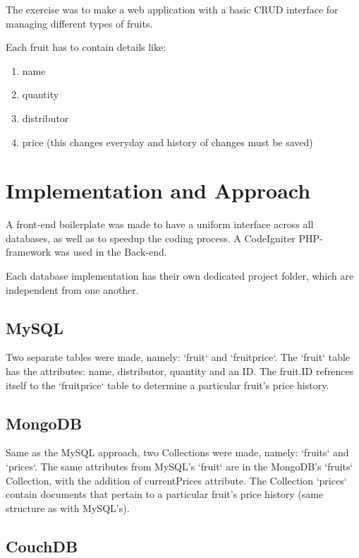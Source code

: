 \documentclass[journal]{./IEEE/IEEEtran}
\title{\SPTITLE}
\author{\ADVISEE}
\begin{document}
\maketitle


The exercise was to make a web application with a basic CRUD interface for managing different types of fruits.

Each fruit has to contain details like:
	\begin{enumerate}
    \item name
    \item quantity
    \item distributor
    \item price (this changes everyday and history of changes must be saved)
    \end{enumerate}

\section{Implementation and Approach}

A front-end boilerplate was made to have a uniform interface across all databases, as well as to speedup the coding process. A CodeIgniter PHP-framework was used in the Back-end.

Each database implementation has their own dedicated project folder, which are independent from one another.
\subsection{MySQL}
Two separate tables were made, namely: `fruit` and `fruitprice`. The `fruit` table has the attributes: name, distributor, quantity and an ID. The fruit.ID refrences itself to the `fruitprice` table to determine a particular fruit's price history.

\subsection{MongoDB}

Same as the MySQL approach, two Collections were made, namely: `fruits` and `prices`. The same attributes from MySQL's `fruit` are in the MongoDB's `fruits` Collection, with the addition of currentPrices attribute. The Collection `prices` contain documents that pertain to a particular fruit's price history (same structure as with MySQL's).

\subsection{CouchDB}
\end{document}
